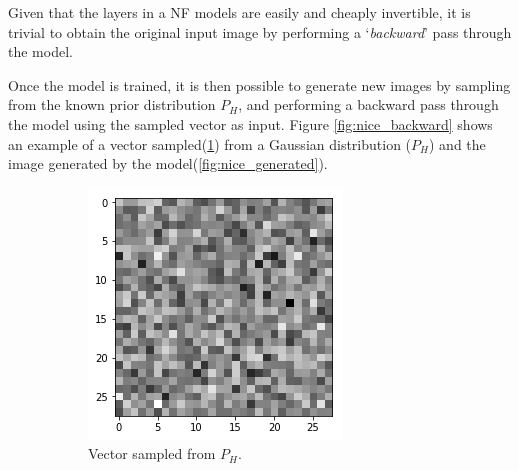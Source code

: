 Given that the layers in a NF models are easily and cheaply invertible, it is trivial to obtain the original input image by performing a `\textit{backward}' pass through the model. 

Once the model is trained, it is then possible to generate new images by sampling from the known prior distribution $P_H$, and performing a backward pass through the model using the sampled vector as input. Figure \ref{fig:nice_backward} shows an example of a vector sampled(\ref{fig:nice_sample}) from a Gaussian distribution ($P_H$) and the image generated by the model(\ref{fig:nice_generated}).

\begin{figure}[htbp!]
     \centering
     \begin{subfigure}[b]{0.45\textwidth}
         \centering
         \includegraphics[width=\textwidth]{Images/sample.png}
         \caption{Vector sampled from $P_H$.}
         \label{fig:nice_sample}
     \end{subfigure} 
     \hfill
     \begin{subfigure}[b]{0.45\textwidth}
         \centering

\end{subfigure}
\end{figure}

